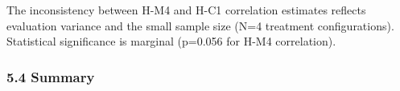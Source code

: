 The inconsistency between H-M4 and H-C1 correlation estimates reflects evaluation variance and the small sample size (N=4 treatment configurations). Statistical significance is marginal (p=0.056 for H-M4 correlation).

\subsubsection{5.4 Summary}

\begin{table}[htbp]
\centering
{}
\end{table}
